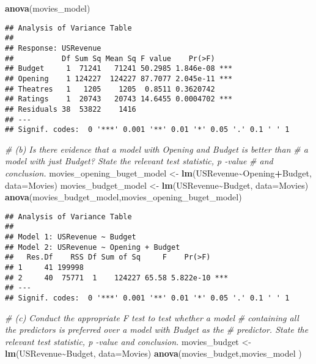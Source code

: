 \documentclass[
]{article}
\newenvironment{Shaded}{\begin{snugshade}}{\end{snugshade}}
\newcommand{\AttributeTok}[1]{\textcolor[rgb]{0.13,0.29,0.53}{#1}}
\newcommand{\CommentTok}[1]{\textcolor[rgb]{0.56,0.35,0.01}{\textit{#1}}}
\newcommand{\FunctionTok}[1]{\textcolor[rgb]{0.13,0.29,0.53}{\textbf{#1}}}
\newcommand{\NormalTok}[1]{#1}
\newcommand{\OtherTok}[1]{\textcolor[rgb]{0.56,0.35,0.01}{#1}}
\newcommand{\SpecialCharTok}[1]{\textcolor[rgb]{0.81,0.36,0.00}{\textbf{#1}}}
\begin{document}
\begin{Shaded}
\begin{Highlighting}[]
\FunctionTok{anova}\NormalTok{(movies\_model)}
\end{Highlighting}
\end{Shaded}

\begin{verbatim}
## Analysis of Variance Table
## 
## Response: USRevenue
##           Df Sum Sq Mean Sq F value    Pr(>F)    
## Budget     1  71241   71241 50.2985 1.846e-08 ***
## Opening    1 124227  124227 87.7077 2.045e-11 ***
## Theatres   1   1205    1205  0.8511 0.3620742    
## Ratings    1  20743   20743 14.6455 0.0004702 ***
## Residuals 38  53822    1416                      
## ---
## Signif. codes:  0 '***' 0.001 '**' 0.01 '*' 0.05 '.' 0.1 ' ' 1
\end{verbatim}

\begin{Shaded}
\begin{Highlighting}[]
\CommentTok{\# (b)  Is there evidence that a model with Opening and Budget is better than }
\CommentTok{\# a model with just Budget? State the relevant test statistic,  p {-}value }
\CommentTok{\# and conclusion. }
\NormalTok{movies\_opening\_buget\_model }\OtherTok{\textless{}{-}} \FunctionTok{lm}\NormalTok{(USRevenue}\SpecialCharTok{\textasciitilde{}}\NormalTok{Opening}\SpecialCharTok{+}\NormalTok{Budget, }\AttributeTok{data=}\NormalTok{Movies)}
\NormalTok{movies\_budget\_model }\OtherTok{\textless{}{-}} \FunctionTok{lm}\NormalTok{(USRevenue}\SpecialCharTok{\textasciitilde{}}\NormalTok{Budget, }\AttributeTok{data=}\NormalTok{Movies)}
\FunctionTok{anova}\NormalTok{(movies\_budget\_model,movies\_opening\_buget\_model)}
\end{Highlighting}
\end{Shaded}

\begin{verbatim}
## Analysis of Variance Table
## 
## Model 1: USRevenue ~ Budget
## Model 2: USRevenue ~ Opening + Budget
##   Res.Df    RSS Df Sum of Sq     F    Pr(>F)    
## 1     41 199998                                 
## 2     40  75771  1    124227 65.58 5.822e-10 ***
## ---
## Signif. codes:  0 '***' 0.001 '**' 0.01 '*' 0.05 '.' 0.1 ' ' 1
\end{verbatim}

\begin{Shaded}
\begin{Highlighting}[]
\CommentTok{\# (c)  Conduct the appropriate  F  test to test whether a model }
\CommentTok{\# containing all the predictors is preferred over a model with Budget as the }
\CommentTok{\# predictor. State the relevant test statistic,  p {-}value and conclusion.}
\NormalTok{movies\_budget }\OtherTok{\textless{}{-}} \FunctionTok{lm}\NormalTok{(USRevenue}\SpecialCharTok{\textasciitilde{}}\NormalTok{Budget, }\AttributeTok{data=}\NormalTok{Movies)}
\FunctionTok{anova}\NormalTok{(movies\_budget,movies\_model )}
\end{Highlighting}
\end{Shaded}
\end{document}
